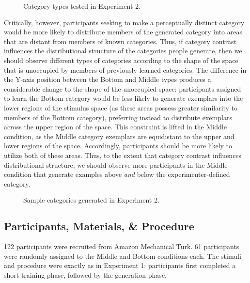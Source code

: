 \documentclass[12pt]{article}
\newcommand\inputpgf[2]{{
\let\pgfimageWithoutPath\pgfimage
\renewcommand{\pgfimage}[2][]{\pgfimageWithoutPath[##1]{#1/##2}}

}}
\begin{document}
\begin{flushleft}
\begin{figure}
    \begin{center}
    
    \caption{Category types tested in Experiment 2.}
    \label{fig:e2-conditions}
    \end{center}
\end{figure}

Critically, however, participants seeking to make a perceptually distinct category would be more likely to distribute members of the generated category into areas that are distant from members of known categories. Thus, if category contrast influences the distributional structure of the categories people generate, then we should observe different types of categories according to the shape of the space that is unoccupied by members of previously learned categories. The difference in the Y-axis position between the Bottom and Middle types produces a considerable change to the shape of the unoccupied space: participants assigned to learn the Bottom category would be less likely to generate exemplars into the lower regions of the stimulus space (as these areas possess greater similarity to members of the Bottom category), preferring instead to distribute exemplars across the upper region of the space. This constraint is lifted in the Middle condition, as the Middle category exemplars are equidistant to the upper and lower regions of the space. Accordingly, participants should be more likely to utilize both of these areas. Thus, to the extent that category contrast influences distributional structure, we should observe more participants in the Middle condition that generate examples above {\em and} below the experimenter-defined category.

\begin{figure}
    \begin{center}
    \inputpgf{figs/}{e2-samples.pgf}
    \caption{Sample categories generated in Experiment 2. }
    \label{fig:e2-samples}
    \end{center}
\end{figure}


\subsection{Participants, Materials, \& Procedure}

122 participants were recruited from Amazon Mechanical Turk. 61 participants were randomly assigned to the Middle and Bottom conditions each. The stimuli and procedure were exactly as in Experiment 1: participants first completed a short training phase, followed by the generation phase.



\end{flushleft}
\end{document}

